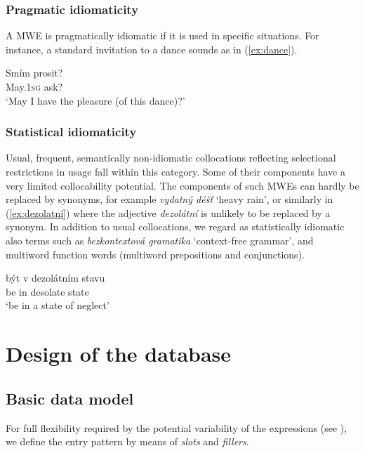 \documentclass[output=paper,colorlinks,citecolor=brown]{langscibook}
\begin{document}
\subsubsection{Pragmatic idiomaticity}
\label{sec:idiom-pragm}
A MWE is pragmatically idiomatic if it is used in specific situations. For instance, a standard invitation to a dance sounds as in (\ref{ex:dance}).

\ea
\gll Smím prosit?\\
     May.\textsc{1sg} ask?\\
\glt `May I have the pleasure (of this dance)?' \label{ex:dance}
\z 


\subsubsection{Statistical idiomaticity}
\label{sec:idiom-stat}
Usual, frequent, semantically non-idiomatic collocations reflecting selectional restrictions in usage fall within this category. Some of their components have a very
limited collocability potential. The components of such MWEs can hardly be
replaced by synonyms, for example \emph{vydatný déšť} ‘heavy rain’, or similarly in  (\ref{ex:dezolatní}) where the adjective \emph{dezolátní} is unlikely to be replaced by a synonym. In addition to usual collocations, we regard as statistically idiomatic also terms such as \emph{bezkontextová gramatika} ‘context-free grammar’,
and multiword function words (multiword prepositions and conjunctions). 



\ea \label{ex:dezolatní}
\gll být v dezolátním stavu\\
     be in desolate state\\
\glt `be in a state of neglect'
\z 



\section{Design of the database}
\label{sec:design}
\subsection{Basic data model}

For full flexibility required by the potential variability of the expressions (see ), we define the entry pattern by means of \emph{slots} and \emph{fillers}.
\end{document}
